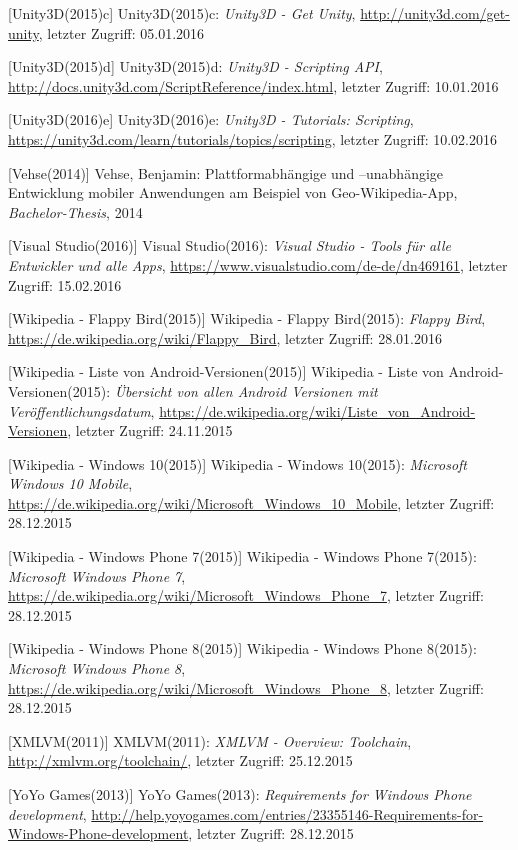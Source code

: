 \begin{thebibliography}{}
[Unity3D(2015)c] Unity3D(2015)c: \emph{Unity3D - Get Unity},
\url{http://unity3d.com/get-unity}, letzter Zugriff: 05.01.2016

[Unity3D(2015)d] Unity3D(2015)d: \emph{Unity3D - Scripting API},
\url{http://docs.unity3d.com/ScriptReference/index.html}, letzter Zugriff: 10.01.2016

[Unity3D(2016)e] Unity3D(2016)e: \emph{Unity3D - Tutorials: Scripting},
\url{https://unity3d.com/learn/tutorials/topics/scripting}, letzter Zugriff: 10.02.2016

[Vehse(2014)] Vehse, Benjamin:
\glqq Plattformabhängige und –unabhängige
Entwicklung mobiler Anwendungen am
Beispiel von Geo-Wikipedia-App\grqq, 
\emph{Bachelor-Thesis}, 2014

[Visual Studio(2016)] Visual Studio(2016): \emph{Visual Studio - Tools für alle Entwickler und alle Apps},
\url{https://www.visualstudio.com/de-de/dn469161}, letzter Zugriff: 15.02.2016

[Wikipedia - Flappy Bird(2015)] Wikipedia - Flappy Bird(2015): \emph{Flappy Bird},
\url{https://de.wikipedia.org/wiki/Flappy_Bird}, letzter Zugriff: 28.01.2016

[Wikipedia - Liste von Android-Versionen(2015)] Wikipedia - Liste von Android-Versionen(2015): \emph{Übersicht von allen Android Versionen mit Veröffentlichungsdatum},
\url{https://de.wikipedia.org/wiki/Liste_von_Android-Versionen}, letzter Zugriff: 24.11.2015

[Wikipedia - Windows 10(2015)] Wikipedia - Windows 10(2015): \emph{Microsoft Windows 10 Mobile},
\url{https://de.wikipedia.org/wiki/Microsoft_Windows_10_Mobile}, letzter Zugriff: 28.12.2015

[Wikipedia - Windows Phone 7(2015)] Wikipedia - Windows Phone 7(2015): \emph{Microsoft Windows Phone 7},
\url{https://de.wikipedia.org/wiki/Microsoft_Windows_Phone_7}, letzter Zugriff: 28.12.2015

[Wikipedia - Windows Phone 8(2015)] Wikipedia - Windows Phone 8(2015): \emph{Microsoft Windows Phone 8},
\url{https://de.wikipedia.org/wiki/Microsoft_Windows_Phone_8}, letzter Zugriff: 28.12.2015

[XMLVM(2011)] XMLVM(2011): \emph{XMLVM - Overview: Toolchain},
\url{http://xmlvm.org/toolchain/}, letzter Zugriff: 25.12.2015

[YoYo Games(2013)] YoYo Games(2013): \emph{Requirements for Windows Phone development},
\url{http://help.yoyogames.com/entries/23355146-Requirements-for-Windows-Phone-development}, letzter Zugriff: 28.12.2015


\end{thebibliography}
\clearpage\thispagestyle{empty}
\eigen  %
